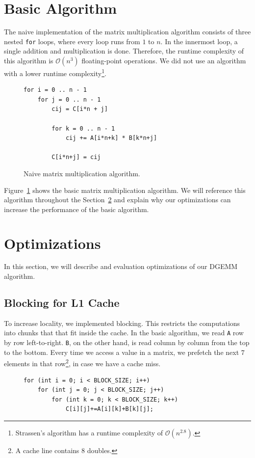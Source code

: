 \documentclass[12pt]{article}
\begin{document}
\section{Basic Algorithm}
The naive implementation of the matrix multiplication algorithm consists of three nested \lstinline{for} loops, where every loop runs from $1$ to $n$. In the innermost loop, a single addition and multiplication is done. Therefore, the runtime complexity of this algorithm is $\mathcal{O}(n^3)$ floating-point operations. We did not use an algorithm with a lower runtime complexity\footnote{Strassen's algorithm has a runtime complexity of $\mathcal{O}(n^{2.8})$.}.

\begin{figure}
\begin{lstlisting}
for i = 0 .. n - 1
	for j = 0 .. n - 1
		cij = C[i*n + j]

		for k = 0 .. n - 1
			cij += A[i*n+k] * B[k*n+j]

		C[i*n+j] = cij
\end{lstlisting}
\caption{Naive matrix multiplication algorithm.}
\label{fig:naive_mul}
\end{figure}
Figure~\ref{fig:naive_mul} shows the basic matrix multiplication algorithm. We will reference this algorithm throughout the Section~\ref{sec:optim} and explain why our optimizations can increase the performance of the basic algorithm.

\section{Optimizations}\label{sec:optim}
In this section, we will describe and evaluation optimizations of our DGEMM algorithm.

\subsection{Blocking for L1 Cache}
To increase locality, we implemented blocking.  This restricts the computations into chunks that that fit inside the cache. In the basic algorithm, we read \lstinline{A} row by row left-to-right. \lstinline{B}, on the other hand, is read column by column from the top to the bottom. Every time we access a value in a matrix, we prefetch the next $7$ elements in that row\footnote{A cache line contains $8$ doubles.}, in case we have a cache miss.

\begin{figure}
\begin{lstlisting}
for (int i = 0; i < BLOCK_SIZE; i++)
	for (int j = 0; j < BLOCK_SIZE; j++)
		for (int k = 0; k < BLOCK_SIZE; k++)
			C[i][j]+=A[i][k]+B[k][j];
\end{lstlisting}
\end{figure}
\end{document}
